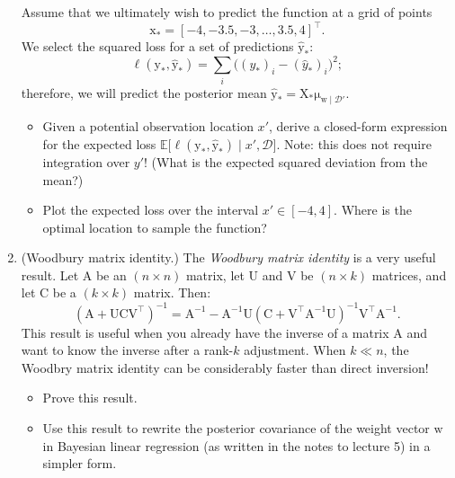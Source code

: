 \documentclass{article}
\newcommand{\given}{\mid}
\newcommand{\mc}[1]{\mathcal{#1}}
\newcommand{\data}{\mc{D}}
\newcommand{\mat}[1]{\bm{\mathrm{#1}}}
\renewcommand{\vec}[1]{\bm{\mathrm{#1}}}
\newcommand{\trans}{^\top}
\newcommand{\inv}{^{-1}}
\begin{document}
\begin{enumerate}
  Assume that we ultimately wish to predict the function at a grid of
  points
  \begin{equation*}
    \vec{x}_\ast = [-4, -3.5, -3, \dotsc, 3.5, 4]\trans.
  \end{equation*}
  We select the squared loss for a set of predictions
  $\hat{\vec{y}}_\ast$:
  \begin{equation*}
    \ell(\vec{y}_\ast, \hat{\vec{y}}_\ast)
    =
    \sum_i \bigl((y_\ast)_i - (\hat{y}_\ast)_i\bigr)^2;
  \end{equation*}
  therefore, we will predict the posterior mean $\hat{\vec{y}}_\ast =
  \mat{X}_\ast \vec{\mu}_{\vec{w}\given\data'}$.
  \begin{itemize}
  \item
    Given a potential observation location $x'$, derive a closed-form
    expression for the expected loss
    $\mathbb{E}\bigl[\ell(\vec{y}_\ast, \hat{\vec{y}}_\ast) \given x',
      \data \bigr]$.  Note: this does not require integration over
    $y'$!  (What is the expected squared deviation from the mean?)
  \item
    Plot the expected loss over the interval $x' \in [-4, 4]$.  Where
    is the optimal location to sample the function?
  \end{itemize}

\item
  (Woodbury matrix identity.)
  The \emph{Woodbury matrix identity} is a very useful result.  Let
  $\mat{A}$ be an $(n \times n)$ matrix, let $\mat{U}$ and $\mat{V}$
  be $(n \times k)$ matrices, and let $\mat{C}$ be a $(k \times k)$
  matrix.  Then:
  \begin{equation*}
    (\mat{A} + \mat{U}\mat{C}\mat{V}\trans)\inv
    =
    \mat{A}\inv
    -
    \mat{A}\inv
    \mat{U}
    (\mat{C} + \mat{V}\trans \mat{A}\inv \mat{U})\inv
    \mat{V}\trans
    \mat{A}\inv.
  \end{equation*}
  This result is useful when you already have the inverse of a matrix
  $\mat{A}$ and want to know the inverse after a rank-$k$ adjustment.
  When $k \ll n$, the Woodbry matrix identity can be considerably
  faster than direct inversion!
  \begin{itemize}
  \item
    Prove this result.
  \item
    Use this result to rewrite the posterior covariance of the weight
    vector $\vec{w}$ in Bayesian linear regression (as written in the
    notes to lecture 5) in a simpler form.
  \end{itemize}


\end{enumerate}
\end{document}
